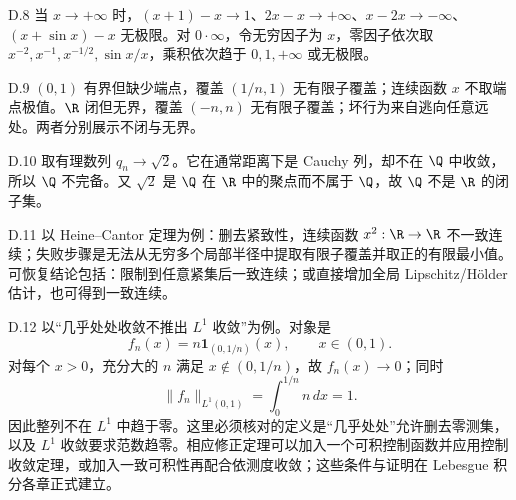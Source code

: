 \begin{solution}{D.8}
当 \(x\to+\infty\) 时，\((x+1)-x\to1\)、\(2x-x\to+\infty\)、\(x-2x\to-\infty\)、\((x+\sin x)-x\) 无极限。对 \(0\cdot\infty\)，令无穷因子为 \(x\)，零因子依次取 \(x^{-2},x^{-1},x^{-1/2},\sin x/x\)，乘积依次趋于 \(0,1,+\infty\) 或无极限。
\end{solution}

\begin{solution}{D.9}
\((0,1)\) 有界但缺少端点，覆盖 \((1/n,1)\) 无有限子覆盖；连续函数 \(x\) 不取端点极值。\(\R\) 闭但无界，覆盖 \((-n,n)\) 无有限子覆盖；坏行为来自逃向任意远处。两者分别展示不闭与无界。
\end{solution}

\begin{solution}{D.10}
取有理数列 \(q_n\to\sqrt2\)。它在通常距离下是 Cauchy 列，却不在 \(\Q\) 中收敛，所以 \(\Q\) 不完备。又 \(\sqrt2\) 是 \(\Q\) 在 \(\R\) 中的聚点而不属于 \(\Q\)，故 \(\Q\) 不是 \(\R\) 的闭子集。
\end{solution}

\begin{solution}{D.11}
以 Heine--Cantor 定理为例：删去紧致性，连续函数 \(x^2:\R\to\R\) 不一致连续；失败步骤是无法从无穷多个局部半径中提取有限子覆盖并取正的有限最小值。可恢复结论包括：限制到任意紧集后一致连续；或直接增加全局 Lipschitz/Hölder 估计，也可得到一致连续。
\end{solution}

\begin{solution}{D.12}
以“几乎处处收敛不推出 \(L^1\) 收敛”为例。对象是
\[
 f_n(x)=n\mathbf1_{(0,1/n)}(x),\qquad x\in(0,1).
\]
对每个 \(x>0\)，充分大的 \(n\) 满足 \(x\notin(0,1/n)\)，故
\(f_n(x)\to0\)；同时
\[
 \|f_n\|_{L^1(0,1)}
 =\int_0^{1/n}n\,dx=1.
\]
因此整列不在 \(L^1\) 中趋于零。这里必须核对的定义是“几乎处处”允许删去零测集，以及 \(L^1\) 收敛要求范数趋零。相应修正定理可以加入一个可积控制函数并应用控制收敛定理，或加入一致可积性再配合依测度收敛；这些条件与证明在 Lebesgue 积分各章正式建立。
\end{solution}

